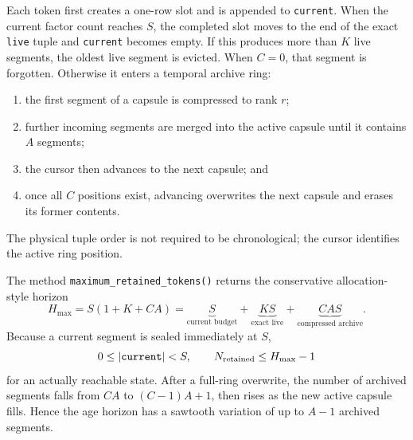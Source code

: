 Each token first creates a one-row slot and is appended to
\texttt{current}.  When the current factor count reaches \(S\), the completed
slot moves to the end of the exact \texttt{live} tuple and
\texttt{current} becomes empty.  If this produces more than \(K\) live
segments, the oldest live segment is evicted.  When \(C=0\), that segment is
forgotten.  Otherwise it enters a temporal archive ring:
\begin{enumerate}
  \item the first segment of a capsule is compressed to rank \(r\);
  \item further incoming segments are merged into the active capsule until it
        contains \(A\) segments;
  \item the cursor then advances to the next capsule; and
  \item once all \(C\) positions exist, advancing overwrites the next capsule
        and erases its former contents.
\end{enumerate}
The physical tuple order is not required to be chronological; the cursor
identifies the active ring position.

The method \texttt{maximum\_retained\_tokens()} returns the conservative
allocation-style horizon
\begin{equation}
  H_{\max}
  =
  S(1+K+CA)
  =
  \underbrace{S}_{\text{current budget}}
  +
  \underbrace{KS}_{\text{exact live}}
  +
  \underbrace{CAS}_{\text{compressed archive}}.
  \label{eq:retained-horizon}
\end{equation}
Because a current segment is sealed immediately at \(S\),
\begin{equation}
  0\leq\left\lvert \texttt{current}\right\rvert<S,
  \qquad
  N_{\mathrm{retained}}\leq H_{\max}-1
  \label{eq:reachable-retained-horizon}
\end{equation}
for an actually reachable state.  After a full-ring overwrite, the number of
archived segments falls from \(CA\) to \((C-1)A+1\), then rises as the new
active capsule fills.  Hence the age horizon has a sawtooth variation of up to
\(A-1\) archived segments.

